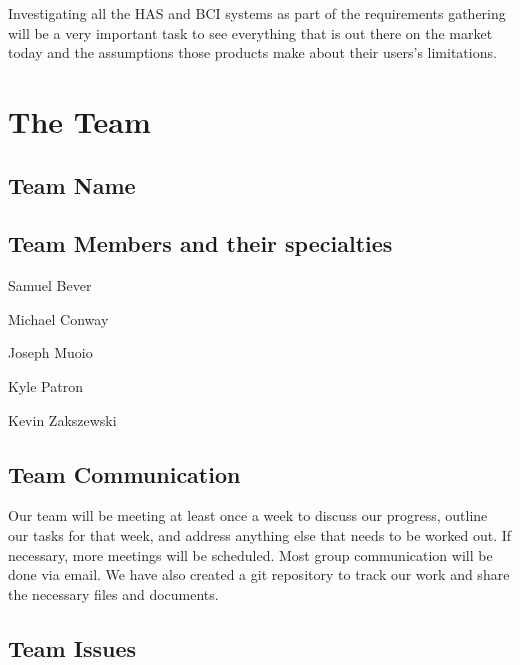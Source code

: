 \documentclass{report}
\begin{document}
Investigating all the HAS and BCI systems as part of the requirements gathering will be a very important task to see everything that is out there on the market today and the assumptions those products make about their users's limitations.

\newpage
\section*{\centering The Team}

\subsection*{Team Name}


\subsection*{Team Members and their specialties}

Samuel Bever

Michael Conway

Joseph Muoio

Kyle Patron

Kevin Zakszewski



\subsection*{Team Communication}
Our team will be meeting at least once a week to discuss our progress, outline our tasks for that week, and  address anything else that needs to be worked out. If necessary, more meetings will be scheduled. Most group communication will be done via email. We have also created a git repository to track our work and share the necessary files and documents.

\subsection*{Team Issues}

\end{document}
